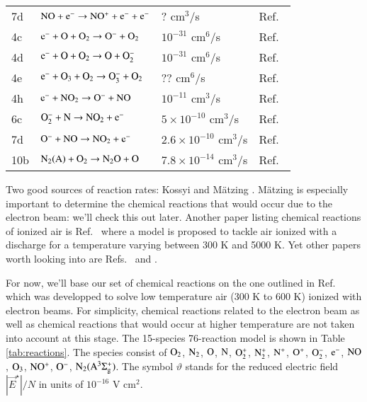 \documentclass{warpdoc}
\let\citen\cite
\begin{document}
\begin{table*}
\begin{threeparttable}
\begin{tabular}{llll}
    7d  & $\rm NO + e^- \rightarrow NO^+ + e^- + e^-$  
       &  ? cm$^3$/s
       & Ref.\ \citen{misc:1992:kossyi}\\
    4c & $\rm e^- + O + O_2 \rightarrow O^- + O_2$  
       & $10^{-31}$ cm$^6$/s
       & Ref.\ \citen{misc:1992:kossyi}\\
    4d & $\rm e^- + O + O_2 \rightarrow O + O_2^-$  
       & $10^{-31}$ cm$^6$/s
       & Ref.\ \citen{misc:1992:kossyi}\\
    4e & $\rm e^- + O_3 + O_2 \rightarrow O_3^- + O_2$  
       & ?? cm$^6$/s
       & Ref.\ \citen{misc:1992:kossyi}\\
    4h & $\rm e^- + NO_2 \rightarrow O^- + NO$  
       & $10^{-11}$ cm$^3$/s
       & Ref.\ \citen{misc:1992:kossyi}\\
    6c  & $\rm O_2^- + N \rightarrow NO_2 + e^-$  
       & $5 \times 10^{-10} $ cm$^3$/s 
       & Ref.\ \citen{misc:1992:kossyi}\\
    7d  & $\rm O^- + NO \rightarrow NO_2 + e^-$  
       & $2.6 \times 10^{-10} $ cm$^3$/s 
       & Ref.\ \citen{misc:1992:kossyi}\\
    10b  & $\rm N_2(A) + O_2 \rightarrow N_2 O + O$  
       & $7.8 \times 10^{-14}$ cm$^3$/s
       & Ref.\ \citen{misc:1992:kossyi}\\
    
    \bottomrule
    \end{tabular}
   \end{threeparttable}
\end{table*}
%

Two good sources of reaction rates: Kossyi \cite{misc:1992:kossyi}
and M\"atzing \cite{misc:1991:matzing}. M\"atzing is especially important to determine the
chemical reactions that would occur due to the electron beam: we'll check this out later.
Another paper listing chemical reactions of ionized air is Ref.\ \citen{misc:1997:aleksandrov} where a model is proposed to tackle air ionized with a discharge for a temperature varying between 300 K and 5000 K. Yet other papers worth looking into are Refs.\ \citen{misc:2000:bourdon} and \citen{aiaaconf:1999:laux}.


For now, we'll base our set of chemical reactions on the one outlined in Ref.\ \citen{misc:2002:macheret} which was developped to solve low temperature air (300 K to 600 K) ionized with electron beams. For simplicity, chemical reactions related to the electron beam as well as chemical reactions that would occur at higher temperature are not taken into account at this stage. The 15-species 76-reaction model is shown in Table \ref{tab:reactions}.
The species consist of $\rm O_2$, $\rm N_2$, $\rm O$, $\rm N$, $\rm O_2^+$, $\rm N_2^+$, $\rm N^+$, $\rm O^+$, $\rm O_2^-$, $\rm e^-$, $\rm NO$, $\rm O_3$, $\rm NO^+$, $\rm O^-$, $\rm N_2(A^3 \Sigma_g^+)$. The symbol $\vartheta$ stands for the reduced electric field $|\vec{E}^\star|/N$ in units of $10^{-16}$ V cm$^2$.
\end{document}

